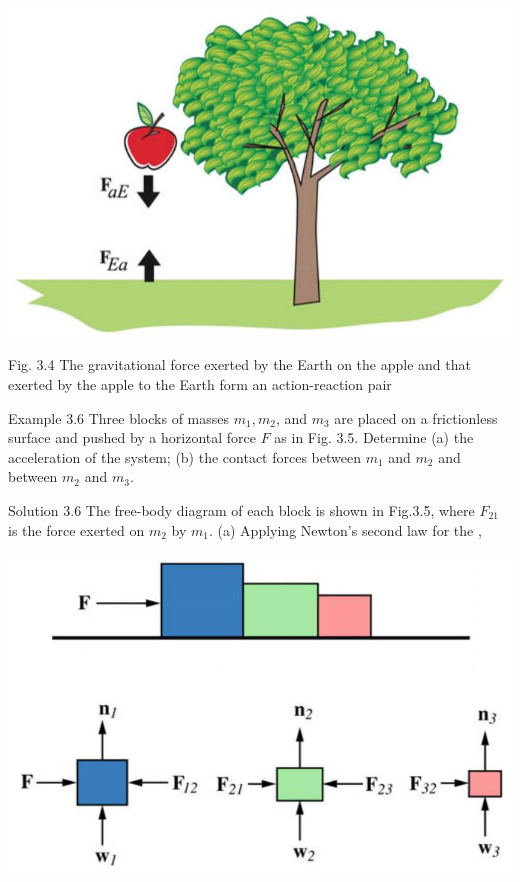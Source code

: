 \documentclass[10pt]{article}
\begin{document}
\begin{center}
\includegraphics[max width=\textwidth]{2024_09_13_db1f357d2aad0a03eb2eg-051(1)}
\end{center}

Fig. 3.4 The gravitational force exerted by the Earth on the apple and that exerted by the apple to the Earth form an action-reaction pair

Example 3.6 Three blocks of masses $m_{1}, m_{2}$, and $m_{3}$ are placed on a frictionless surface and pushed by a horizontal force $F$ as in Fig. 3.5. Determine (a) the acceleration of the system; (b) the contact forces between $m_{1}$ and $m_{2}$ and between $m_{2}$ and $m_{3}$.

Solution 3.6 The free-body diagram of each block is shown in Fig.3.5, where $F_{21}$ is the force exerted on $m_{2}$ by $m_{1}$. (a) Applying Newton's second law for the ,

\begin{center}
\includegraphics[max width=\textwidth]{2024_09_13_db1f357d2aad0a03eb2eg-052}
\end{center}
\end{document}
